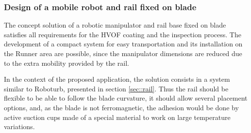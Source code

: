 \subsubsection{Design of a mobile robot and rail fixed on blade}\label{proj_rail}
The concept solution of a robotic manipulator and rail base fixed on blade
satisfies all requirements for the HVOF coating and the inspection process. The
development of a compact system for easy transportation and its installation on
the Runner area are possible, since the manipulator dimensions are reduced due
to the extra mobility provided by the rail.


In the context of the proposed application, the solution consists in a system
similar to Roboturb, presented in section \ref{sec::rail}. Thus the rail should
be flexible to be able to follow the blade curvature, it should allow several
placement options, and, as the blade is not ferromagnetic, the adhesion would
be done by active suction cups made of a special material to work on large
temperature variations.



